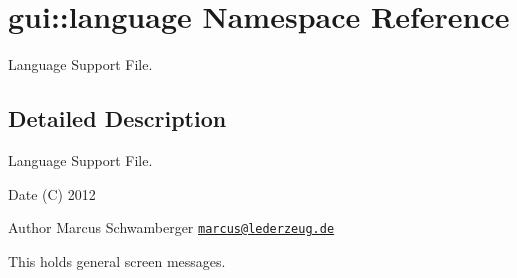 \hypertarget{namespacegui_1_1language}{
\section{gui::language Namespace Reference}
\label{namespacegui_1_1language}
}


Language Support File.  




\subsection{Detailed Description}
Language Support File. \begin{DoxyDate}{Date}
(C) 2012 
\end{DoxyDate}
\begin{DoxyAuthor}{Author}
Marcus Schwamberger  \href{mailto:marcus@lederzeug.de}{\tt marcus@lederzeug.de}
\end{DoxyAuthor}
This holds general screen messages. 